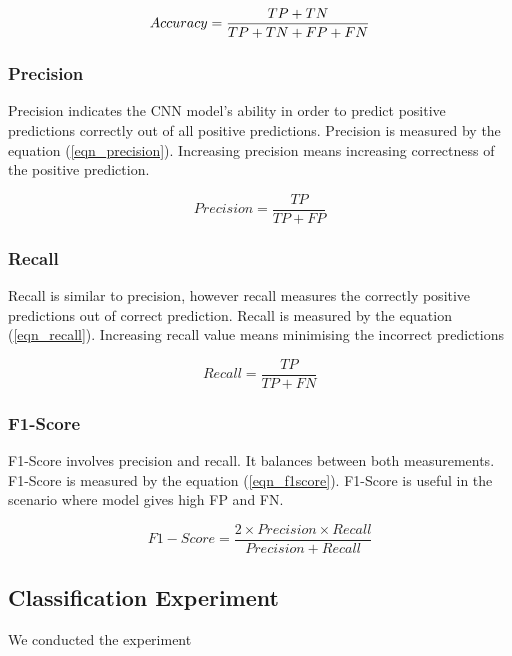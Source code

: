 \documentclass[conference]{IEEEtran}
\begin{document}
\begin{equation}
Accuracy = \frac{TP + TN}{TP + TN + FP + FN} \\
\label{eqn_accuracy}
\end{equation}

\subsubsection{Precision}
Precision indicates the CNN model's ability in order to predict positive predictions correctly out of all positive predictions.  Precision is measured by the equation (\ref{eqn_precision}). Increasing precision means increasing correctness of the positive prediction.

\begin{equation}
Precision = \frac{TP}{TP + FP}
\label{eqn_precision}
\end{equation}

\subsubsection{Recall}
Recall is similar to precision, however recall measures the correctly positive predictions out of correct prediction. Recall is measured by the equation (\ref{eqn_recall}). Increasing recall value means minimising the incorrect predictions

\begin{equation}
Recall = \frac{TP}{TP + FN}
\label{eqn_recall}
\end{equation}

\subsubsection{F1-Score}
F1-Score involves precision and recall. It balances between both measurements. F1-Score is measured by the equation (\ref{eqn_f1score}). F1-Score is useful in the scenario where model gives high FP and FN.

\begin{equation}
F1-Score = \frac{2 \times Precision \times Recall}{Precision + Recall}
\label{eqn_f1score}
\end{equation}

\subsection{Classification Experiment}

We conducted the experiment 
\end{document}
